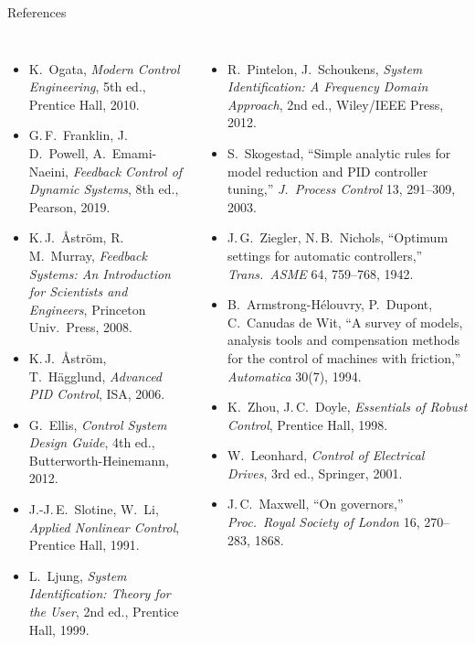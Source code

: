 \documentclass[aspectratio=169,10pt]{beamer}
\begin{document}
\begin{frame}{References}
\fontsize{7}{8.5}\selectfont
\begin{columns}[T]
\begin{itemize}
  \item K.\ Ogata, \emph{Modern Control Engineering}, 5th ed., Prentice Hall, 2010.
  \item G.\,F.\ Franklin, J.\,D.\ Powell, A.\ Emami-Naeini, \emph{Feedback Control of Dynamic Systems}, 8th ed., Pearson, 2019.
  \item K.\,J.\ \AA str\"om, R.\,M.\ Murray, \emph{Feedback Systems: An Introduction for Scientists and Engineers}, Princeton Univ.\ Press, 2008.
  \item K.\,J.\ \AA str\"om, T.\ H\"agglund, \emph{Advanced PID Control}, ISA, 2006.
  \item G.\ Ellis, \emph{Control System Design Guide}, 4th ed., Butterworth-Heinemann, 2012.
  \item J.-J.\,E.\ Slotine, W.\ Li, \emph{Applied Nonlinear Control}, Prentice Hall, 1991.
  \item L.\ Ljung, \emph{System Identification: Theory for the User}, 2nd ed., Prentice Hall, 1999.
\end{itemize}
\begin{itemize}
  \item R.\ Pintelon, J.\ Schoukens, \emph{System Identification: A Frequency Domain Approach}, 2nd ed., Wiley/IEEE Press, 2012.
  \item S.\ Skogestad, ``Simple analytic rules for model reduction and PID controller tuning,'' \emph{J.\ Process Control} 13, 291--309, 2003.
  \item J.\,G.\ Ziegler, N.\,B.\ Nichols, ``Optimum settings for automatic controllers,'' \emph{Trans.\ ASME} 64, 759--768, 1942.
  \item B.\ Armstrong-H\'elouvry, P.\ Dupont, C.\ Canudas de Wit, ``A survey of models, analysis tools and compensation methods for the control of machines with friction,'' \emph{Automatica} 30(7), 1994.
  \item K.\ Zhou, J.\,C.\ Doyle, \emph{Essentials of Robust Control}, Prentice Hall, 1998.
  \item W.\ Leonhard, \emph{Control of Electrical Drives}, 3rd ed., Springer, 2001.
  \item J.\,C.\ Maxwell, ``On governors,'' \emph{Proc.\ Royal Society of London} 16, 270--283, 1868.
\end{itemize}
\end{columns}
\end{frame}
\end{document}
